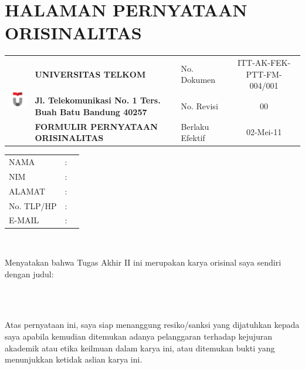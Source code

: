 \chapter*{\uppercase{halaman pernyataan orisinalitas}}

\begin{tabular}{|c|p{16.57em}|p{6.645em}|c|}
	\hline
	\multicolumn{1}{|c|}{\multirow{3}[6]{*}{\includegraphics[width=2cm]{pics/telu.png}}} & \textbf{UNIVERSITAS TELKOM} & No. Dokumen & \multicolumn{1}{p{6.645em}|}{ITT-AK-FEK-PTT-FM-004/001} \bigstrut\\
	\cline{2-4}  & \textbf{Jl. Telekomunikasi No. 1 Ters. Buah Batu Bandung 40257} & No. Revisi & \multicolumn{1}{p{6.645em}|}{00} \bigstrut\\
	\cline{2-4}  & \textbf{FORMULIR PERNYATAAN ORISINALITAS} & Berlaku Efektif & 02-Mei-11 \bigstrut\\
	\hline
\end{tabular}%



\vspace*{0.4cm}
\noindent 

\noindent
\begin{tabular}{ll p{9cm}}
	NAMA&: & \penulis \\
	NIM&: & \npm \\
	ALAMAT&: & \npm \\
	No. TLP/HP&: & \npm \\
	E-MAIL&: & \npm \\
\end{tabular} \\

\vspace*{1.0cm}

\noindent Menyatakan bahwa Tugas Akhir II ini merupakan karya orisinal saya sendiri dengan judul:\\
\begin{center}
	\textbf{\judul}\\[0.5cm]
	\textit{\Judulen}\\[1.0cm]
\end{center}
\noindent Atas pernyataan ini, saya siap menanggung resiko/sanksi yang dijatuhkan kepada saya apabila kemudian ditemukan adanya pelanggaran terhadap kejujuran akademik atau etika keilmuan dalam karya ini, atau ditemukan bukti yang menunjukkan ketidak aslian karya ini.\\



\newpage